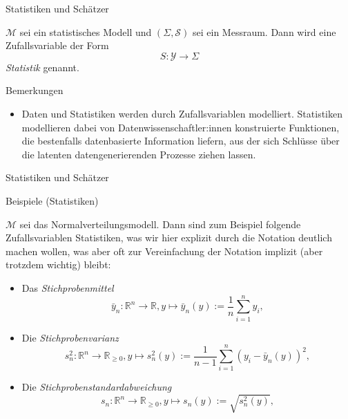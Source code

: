 \documentclass[
  8pt,
  ignorenonframetext,
]{beamer}
\providecommand{\tightlist}{%
  \setlength{\itemsep}{0pt}\setlength{\parskip}{0pt}}
\begin{document}
\begin{frame}{Statistiken und Schätzer}
\protect\hypertarget{statistiken-und-schuxe4tzer}{}
\small
\begin{definition}[Statistik]
\justifying
$\mathcal{M}$ sei ein statistisches Modell und $(\Sigma,\mathcal{S})$ sei ein Messraum.
Dann wird eine Zufallsvariable der Form
\begin{equation}
S : \mathcal{Y} \to \Sigma
\end{equation}
\textit{Statistik} genannt.
\end{definition}

Bemerkungen

\begin{itemize}
\tightlist
\item
  \justifying Daten und Statistiken werden durch Zufallsvariablen
  modelliert. Statistiken modellieren dabei von
  Datenwissenschaftler:innen konstruierte Funktionen, die bestenfalls
  datenbasierte Information liefern, aus der sich Schlüsse über die
  latenten datengenerierenden Prozesse ziehen lassen.
\end{itemize}
\end{frame}

\begin{frame}{Statistiken und Schätzer}
\protect\hypertarget{statistiken-und-schuxe4tzer-1}{}
\small

Beispiele (Statistiken)

\small

\(\mathcal{M}\) sei das Normalverteilungsmodell. Dann sind zum Beispiel
folgende Zufallsvariablen Statistiken, was wir hier explizit durch die
Notation deutlich machen wollen, was aber oft zur Vereinfachung der
Notation implizit (aber trotzdem wichtig) bleibt:

\begin{itemize}
\tightlist
\item
  Das \textit{Stichprobenmittel} \begin{equation}
  \bar{y}_n : \mathbb{R}^n \to \mathbb{R},
  y \mapsto \bar{y}_n(y) := \frac{1}{n}\sum_{i=1}^n y_i,
  \end{equation}
\item
  Die \textit{Stichprobenvarianz} \begin{equation}
  s^2_n  : \mathbb{R}^n \to \mathbb{R}_{\ge 0},
  y \mapsto s^2_n(y) := \frac{1}{n-1}\sum_{i=1}^n (y_i - \bar{y}_n(y))^2,
  \end{equation}
\item
  Die \textit{Stichprobenstandardabweichung} \begin{equation}
  s_n  : \mathbb{R}^n \to \mathbb{R}_{\ge 0},
  y \mapsto s_n(y) := \sqrt{s_n^2(y)},
  \end{equation}
\end{itemize}
\end{frame}
\end{document}
